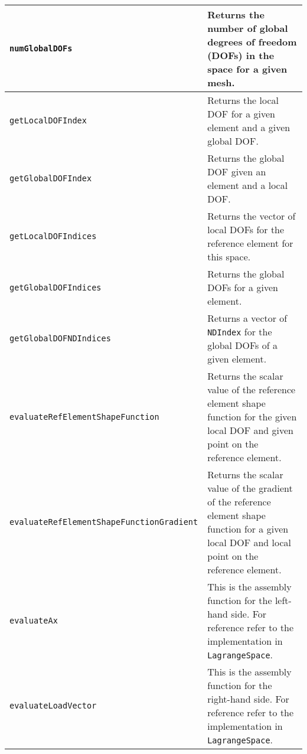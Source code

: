 \vspace*{0.5cm}\noindent
\begin{tabular}{| l | p{6.5cm} |}
    \hline
    \texttt{numGlobalDOFs}                           & Returns the number of global degrees of freedom (DOFs) in the space for a given mesh.                                                            \\ \hline
    \texttt{getLocalDOFIndex}                        & Returns the local DOF for a given element and a given global DOF.                                                                                \\ \hline
    \texttt{getGlobalDOFIndex}                       & Returns the global DOF given an element and a local DOF.                                                                                         \\ \hline
    \texttt{getLocalDOFIndices}                      & Returns the vector of local DOFs for the reference element for this space.                                                                       \\ \hline
    \texttt{getGlobalDOFIndices}                     & Returns the global DOFs for a given element.                                                                                                     \\ \hline
    \texttt{getGlobalDOFNDIndices}                   & Returns a vector of \texttt{NDIndex} for the global DOFs of a given element.                                                                     \\ \hline
    \texttt{evaluateRefElementShapeFunction}         & Returns the scalar value of the reference element shape function for the given local DOF and given point on the reference element.               \\ \hline
    \texttt{evaluateRefElementShapeFunctionGradient} & Returns the scalar value of the gradient of the reference element shape function for a given local DOF and local point on the reference element. \\ \hline
    \texttt{evaluateAx}                              & This is the assembly function for the left-hand side. For reference refer to the implementation in \texttt{LagrangeSpace}.                       \\ \hline
    \texttt{evaluateLoadVector}                      & This is the assembly function for the right-hand side. For reference refer to the implementation in \texttt{LagrangeSpace}.                      \\ \hline
\end{tabular}
\vspace*{0.5cm}

